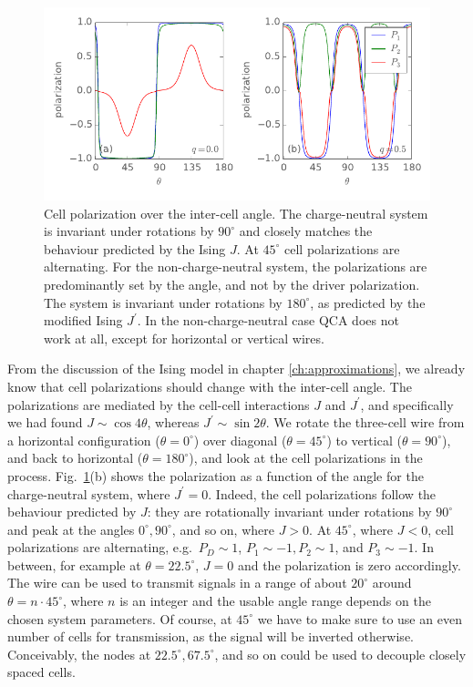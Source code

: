 %
\begin{figure}
  \center
  \includegraphics{three_cells_P_over_theta}
  \caption{
  Cell polarization over the inter-cell angle. The charge-neutral system is
  invariant under rotations by $90^{\circ}$ and closely matches the behaviour
  predicted by the Ising $J$. At $45^{\circ}$ cell polarizations are
  alternating. For the non-charge-neutral system, the polarizations are
  predominantly set by the angle, and not by the driver polarization. The system
  is invariant under rotations by $180^{\circ}$, as predicted by the modified
  Ising $J^{\prime}$. In the non-charge-neutral case QCA does not work at all,
  except for horizontal or vertical wires.
  }
  \label{fig:three_cells_P_over_theta}
\end{figure}
%
From the discussion of the Ising model in chapter \ref{ch:approximations}, we
already know that cell polarizations should change with the inter-cell angle.
The polarizations are mediated by the cell-cell interactions $J$ and
$J^{\prime}$, and specifically we had found $J \sim \cos{4 \theta}$, whereas
$J^{\prime} \sim \sin{2 \theta}$. We rotate the three-cell wire from a
horizontal configuration ($\theta = 0^{\circ}$) over diagonal ($\theta =
45^{\circ}$) to vertical ($\theta = 90^{\circ}$), and back to horizontal
($\theta = 180^{\circ}$), and look at the cell polarizations in the process.
Fig.~\ref{fig:three_cells_P_over_theta}(b) shows the polarization as a function
of the angle for the charge-neutral system, where $J^{\prime} = 0$. Indeed, the
cell polarizations follow the behaviour predicted by $J$: they are rotationally
invariant under rotations by $90^{\circ}$ and peak at the angles $0^{\circ},
90^{\circ}$, and so on, where $J > 0$. At $45^{\circ}$, where $J < 0$, cell
polarizations are alternating, e.g.~$P_D \sim 1$, $P_1 \sim -1, P_2 \sim 1$, and
$P_3 \sim -1$. In between, for example at $\theta = 22.5^{\circ}$, $J = 0$ and
the polarization is zero accordingly. The wire can be used to transmit signals
in a range of about $20^{\circ}$ around $\theta = n \cdot 45^{\circ}$, where $n$
is an integer and the usable angle range depends on the chosen system
parameters. Of course, at $45^{\circ}$ we have to make sure to use an even
number of cells for transmission, as the signal will be inverted otherwise.
Conceivably, the nodes at $22.5^{\circ}, 67.5^{\circ}$, and so on could be used
to decouple closely spaced cells.

